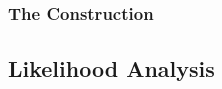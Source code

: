 

%
%

\subsubsection{The \cls Construction}
\label{sec:cls_method}

%
%

\subsection{Likelihood Analysis}
\label{sec:likelihood}

